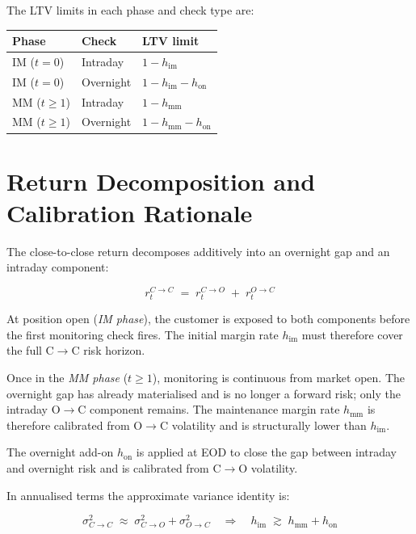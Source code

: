 \documentclass[9pt, a4paper]{extarticle}
\newenvironment{formulabox}{\par\addvspace{4pt}}{\par\addvspace{4pt}}
\begin{document}
\bigskip

The LTV limits in each phase and check type are:

\begin{tabularx}{\linewidth}{llX}
\toprule
\textbf{Phase} & \textbf{Check} & \textbf{LTV limit} \\
\midrule
IM ($t = 0$)     & Intraday  & $1 - h_{\mathrm{im}}$ \\
IM ($t = 0$)     & Overnight & $1 - h_{\mathrm{im}} - h_{\mathrm{on}}$ \\
MM ($t \geq 1$)  & Intraday  & $1 - h_{\mathrm{mm}}$ \\
MM ($t \geq 1$)  & Overnight & $1 - h_{\mathrm{mm}} - h_{\mathrm{on}}$ \\
\bottomrule
\end{tabularx}

\section{Return Decomposition and Calibration Rationale}
\label{sec:decomp}

The close-to-close return decomposes additively into an overnight gap and an
intraday component:

\begin{formulabox}
\[
    r^{C \to C}_t \;=\; r^{C \to O}_t \;+\; r^{O \to C}_t
\]
\end{formulabox}

At position open (\textit{IM phase}), the customer is exposed to both components
before the first monitoring check fires. The initial margin rate $h_{\mathrm{im}}$
must therefore cover the full C$\to$C risk horizon.

Once in the \textit{MM phase} ($t \geq 1$), monitoring is continuous from market
open. The overnight gap has already materialised and is no longer a forward risk;
only the intraday O$\to$C component remains. The maintenance margin rate
$h_{\mathrm{mm}}$ is therefore calibrated from O$\to$C volatility and is
structurally lower than $h_{\mathrm{im}}$.

The overnight add-on $h_{\mathrm{on}}$ is applied at EOD to close the gap between
intraday and overnight risk and is calibrated from C$\to$O volatility.

In annualised terms the approximate variance identity is:

\[
    \sigma^2_{C \to C} \;\approx\; \sigma^2_{C \to O} + \sigma^2_{O \to C}
    \quad\Longrightarrow\quad
    h_{\mathrm{im}} \;\gtrsim\; h_{\mathrm{mm}} + h_{\mathrm{on}}
\]
\end{document}
